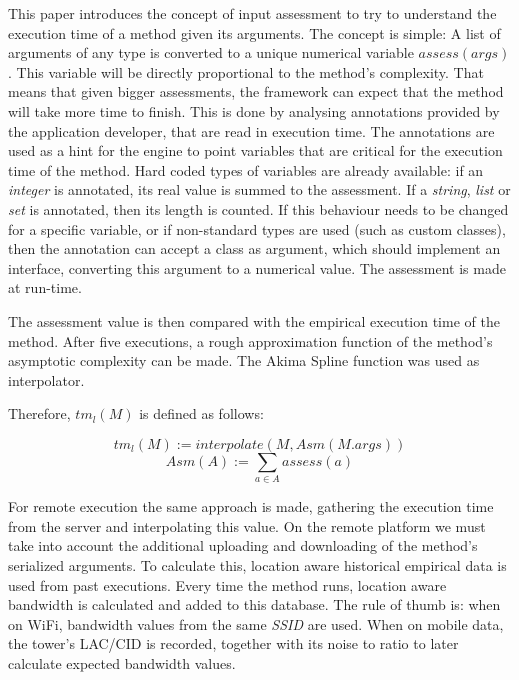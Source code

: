 \documentclass[10pt, conference, letterpaper]{IEEEtran}
\begin{document}
  This paper introduces the concept of input assessment to try to understand the execution time of a method given its arguments. The concept is simple: A list of arguments of any type is converted to a unique numerical variable $assess(args)$. This variable will be directly proportional to the method's complexity. That means that given bigger assessments, the framework can expect that the method will take more time to finish. This is done by analysing annotations provided by the application developer, that are read in execution time. The annotations are used as a hint for the engine to point variables that are critical for the execution time of the method. Hard coded types of variables are already available: if an \textit{integer} is annotated, its real value is summed to the assessment. If a \textit{string}, \textit{list} or \textit{set} is annotated, then its length is counted. If this behaviour needs to be changed for a specific variable, or if non-standard types are used (such as custom classes), then the annotation can accept a class as argument, which should implement an interface, converting this argument to a numerical value. The assessment is made at run-time. 

  The assessment value is then compared with the empirical execution time of the method. After five executions, a rough approximation function of the method's asymptotic complexity can be made. The Akima Spline function was used as interpolator.

  Therefore, $tm_{l}(M)$ is defined as follows:

  \begin{equation} \label{eq:timelocal}
    tm_{l}(M) := interpolate(M, Asm(M.args))
  \end{equation}
  \begin{equation}
    Asm(A) := \sum_{a \in A} assess(a)
  \end{equation}

  For remote execution the same approach is made, gathering the execution time from the server and interpolating this value. On the remote platform we must take into account the additional uploading and downloading of the method's serialized arguments. To calculate this, location aware historical empirical data is used from past executions. Every time the method runs, location aware bandwidth is calculated and added to this database. The rule of thumb is: when on WiFi, bandwidth values from the same \textit{SSID} are used. When on mobile data, the tower's LAC/CID is recorded, together with its noise to ratio to later calculate expected bandwidth values.
\end{document}
